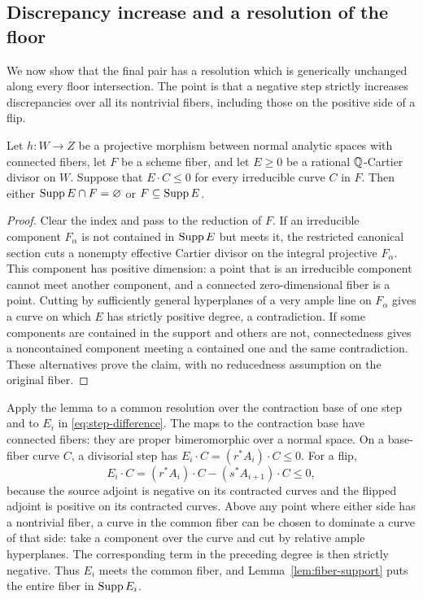 \subsection{Discrepancy increase and a resolution of the floor}

We now show that the final pair has a resolution which is generically
unchanged along every floor intersection.  The point is that a negative
step strictly increases discrepancies over all its nontrivial fibers,
including those on the positive side of a flip.

\begin{lemma}\label{lem:fiber-support}
Let \(h:W\to Z\) be a projective morphism between normal analytic spaces
with connected fibers, let
\(F\) be a scheme fiber, and let \(E\geq0\) be a rational
\(\mathbb Q\)-Cartier divisor on \(W\).  Suppose that \(E\cdot C\leq0\) for
every irreducible curve \(C\) in \(F\).  Then either
\(\operatorname{Supp} E\cap F=\varnothing\) or \(F\subseteq\operatorname{Supp} E\).
\end{lemma}
\begin{proof}
Clear the index and pass to the reduction of \(F\).  If an irreducible
component \(F_\alpha\) is not contained in \(\operatorname{Supp} E\) but meets it,
the restricted canonical section cuts a nonempty effective Cartier
divisor on the integral projective \(F_\alpha\).  This component has
positive dimension: a point that is an irreducible component cannot meet
another component, and a connected zero-dimensional fiber is a point.
Cutting by sufficiently general hyperplanes of a very ample line on
\(F_\alpha\) gives a curve on which \(E\) has strictly positive degree,
a contradiction.  If some components are contained in the support and
others are not, connectedness gives a noncontained component meeting a
contained one and the same contradiction.  These alternatives prove the
claim, with no reducedness assumption on the original fiber.
\end{proof}

Apply the lemma to a common resolution over the contraction base of one
step and to \(E_i\) in \eqref{eq:step-difference}.  The maps to the
contraction base have connected fibers: they are proper bimeromorphic
over a normal space.  On a base-fiber curve \(C\), a divisorial step has
\(E_i\cdot C=(r^*A_i)\cdot C\leq0\).  For a flip,
\[
 E_i\cdot C=(r^*A_i)\cdot C-(s^*A_{i+1})\cdot C\leq0,
\]
because the source adjoint is negative on its contracted curves and the
flipped adjoint is positive on its contracted curves.  Above any point
where either side has a nontrivial fiber, a curve in the common fiber can
be chosen to dominate a curve of that side: take a component over the
curve and cut by relative ample hyperplanes.  The corresponding term in
the preceding degree is then strictly negative.  Thus \(E_i\) meets the
common fiber, and Lemma~\ref{lem:fiber-support} puts the entire fiber in
\(\operatorname{Supp} E_i\).


